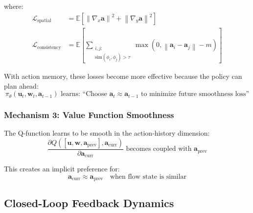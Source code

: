 \documentclass[11pt,a4paper]{article}
\newcommand{\E}{\mathbb{E}}
\newcommand{\norm}[1]{\left\|#1\right\|}
\theoremstyle{definition}
\begin{document}
where:
\begin{align}
    \mathcal{L}_{\text{spatial}} &= \E\left[\norm{\nabla_x \mathbf{a}}^2 + \norm{\nabla_y \mathbf{a}}^2\right] \\
    \mathcal{L}_{\text{consistency}} &= \E\left[\sum_{\substack{i,j : \\\text{sim}(\phi_i, \phi_j) > \tau}} \max(0, \norm{\mathbf{a}_i - \mathbf{a}_j} - m)\right]
\end{align}

With action memory, these losses become more effective because the policy can plan ahead:
\begin{equation}
    \pi_\theta(\mathbf{u}_t, \mathbf{w}_t, \mathbf{a}_{t-1}) \text{ learns: ``Choose } \mathbf{a}_t \approx \mathbf{a}_{t-1} \text{ to minimize future smoothness loss''}
\end{equation}

\subsubsection{Mechanism 3: Value Function Smoothness}

The Q-function learns to be smooth in the action-history dimension:
\begin{equation}
    \frac{\partial Q([\mathbf{u}, \mathbf{w}, \mathbf{a}_{\text{prev}}], \mathbf{a}_{\text{curr}})}{\partial \mathbf{a}_{\text{curr}}} \text{ becomes coupled with } \mathbf{a}_{\text{prev}}
\end{equation}

This creates an implicit preference for:
\begin{equation}
    \mathbf{a}_{\text{curr}} \approx \mathbf{a}_{\text{prev}} \quad \text{when flow state is similar}
\end{equation}

\subsection{Closed-Loop Feedback Dynamics}
\end{document}
